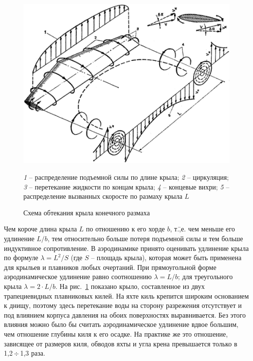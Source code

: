 \documentclass[a4paper, 12pt, twoside, final, book, russian, fittopage, cyremdash]{ncc}
\newcommand{\otdo}{\,\ensuremath{\div}\,}
\begin{document}
\begin{figure}[htb]
  \centering
  \includegraphics[scale=0.5]{0010.jpg}
  \caption{Схема обтекания крыла конечного размаха}
  \label{fig:10}
  \centering
  \small
  \textit{1} \--- распределение подъемной силы по длине крыла;
  \textit{2} \--- циркуляция;
  \textit{3} \--- перетекание жидкости по концам крыла;
  \textit{4} \--- концевые вихри;
  \textit{5} \--- распределение вызванных скоросте по размаху крыла $L$
\end{figure}

Чем короче длина крыла $L$ по отношению к его хорде $b$, т.\=,е. чем меньше его удлинение $L/b$, тем относительно больше потеря подъемной силы и тем больше индуктивное сопротивление. В аэродинамике принято оценивать удлинение крыла по формуле $\lambda = L^2/S$ (где $S$ \--- площадь крыла), которая может быть применена для крыльев и плавников любых очертаний. При прямоугольной форме аэродинамическое удлинение равно соотношению $\lambda = L / b$; для треугольного крыла $\lambda = 2 \cdot L / b$.
На рис.~\ref{fig:10} показано крыло, составленное из двух трапециевидных плавниковых килей. На яхте киль крепится широким основанием к днищу, поэтому здесь перетекание воды на сторону разрежения отсутствует и под влиянием корпуса давления на обоих поверхностях выравнивается. Без этого влияния можно было бы считать аэродинамическое удлинение вдвое большим, чем отношение глубины киля к его осадке. На практике же это отношение, зависящее от размеров киля, обводов яхты и угла крена превышается только в 1,2\otdo 1,3 раза.
\end{document}

